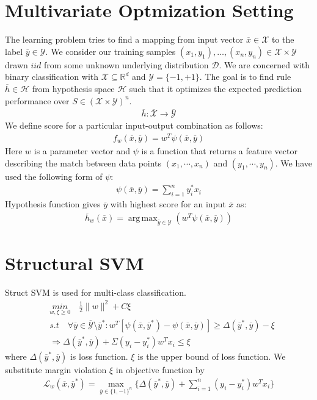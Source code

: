 \documentclass{article} %
\DeclareMathOperator*{\argmax}{arg\,max}
\begin{document}
\section{Multivariate Optmization Setting}
The learning problem tries to find a mapping from input vector $\overline{x} \in \mathcal{X}$ to the label $\overline{y} \in \mathcal{Y}$. We consider our training samples $(x_1,y_1),\ldots,(x_n,y_n) \in \mathcal{X} \times \mathcal{Y}$ drawn $\textit{iid}$ from some unknown underlying distribution $\mathcal{D}$. We are concerned with binary classification with $\mathcal{X} \subseteq \mathbb{R}^d$ and $\mathcal{Y}=\{-1,+1\}$. The goal is to find rule $\overline{h} \in \mathcal{H}$ from hypothesis space $\mathcal{H}$ such that it optimizes the expected prediction performance over $S \in (\mathcal{X} \times \mathcal{Y})^n$. 
\begin{align*}
\overline{h}:\overline{\mathcal{X}} \rightarrow \overline{\mathcal{Y}}
\end{align*}
We define score for a particular input-output combination as follows:
\begin{align*}
f_w(\overline{x},\overline{y}) = w^T\psi({\overline{x},\overline{y}})
\end{align*}
Here $w$ is a parameter vector and $\psi$ is a function that returns a feature vector describing the match between data points $(x_1, \cdots, x_n)$ and $(y_1, \cdots, y_n)$. We have used the following form of $\psi$:
\begin{align*}
\psi(\overline{x},\overline{y}) = \sum_{i=1}^n y_i^*x_i
\end{align*}
Hypothesis function gives $\overline{y}$ with highest score for an input $\overline{x}$ as:
\begin{align*}
\overline{h}_w(\overline{x})=\argmax_{\overline{y}\in\mathcal{Y}}(w^T\psi({\overline{x},\overline{y}}))
\end{align*}

\section{Structural SVM}

Struct SVM is used for multi-class classification.
\begin{equation*}
\begin{split}
& \underset{w,\xi \geq 0}{min} \quad \frac{1}{2}\|w\|^2+C\xi\\
& s.t \quad \forall\overline{y} \in \overline{\mathcal{Y}}\setminus\overline{y}^*:w^T[\psi(\overline{x},\overline{y}^*)- \psi(\overline{x},\overline{y})]\geq \Delta(\overline{y}^*,\overline{y})-\xi\\
& \Rightarrow \Delta(\overline{y}^*,\overline{y}) + \Sigma (y_i - y_i^*)w^Tx_i \leq \xi
\end{split}
\end{equation*}
where $\Delta(\overline{y}^*,\overline{y})$ is loss function.	
$\xi$ is the upper bound of loss function.
We substitute margin violation $\xi$ in objective function by
\begin{align}
\label{eqn:1}
\mathcal L_w(\overline{x},\overline{y}^*)=\max_{\overline{y}\in\{1,-1\}^n}\{\Delta(\overline{y}^*,\overline{y}) + \sum_{i=1}^n (y_i - y_i^*)w^Tx_i\}
\end{align}
\end{document}
